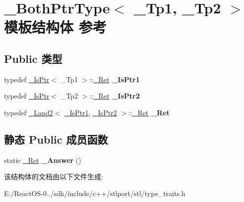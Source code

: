 \hypertarget{struct___both_ptr_type}{}\section{\+\_\+\+Both\+Ptr\+Type$<$ \+\_\+\+Tp1, \+\_\+\+Tp2 $>$ 模板结构体 参考}
\label{struct___both_ptr_type}
\subsection*{Public 类型}
\begin{DoxyCompactItemize}
\item 
\mbox{\label{struct___both_ptr_type_a25b3a6aef390c11484372e0f6ec66699}} 
typedef \hyperlink{struct___is_ptr}{\+\_\+\+Is\+Ptr}$<$ \+\_\+\+Tp1 $>$\+::\hyperlink{struct____false__type}{\+\_\+\+Ret} {\bfseries \+\_\+\+Is\+Ptr1}
\item 
\mbox{\label{struct___both_ptr_type_a33af175b556a1c0d711ba8f55c0f0ba8}} 
typedef \hyperlink{struct___is_ptr}{\+\_\+\+Is\+Ptr}$<$ \+\_\+\+Tp2 $>$\+::\hyperlink{struct____false__type}{\+\_\+\+Ret} {\bfseries \+\_\+\+Is\+Ptr2}
\item 
\mbox{\label{struct___both_ptr_type_a6c8796c4ce6a9fb7cfaae6b50b489fa7}} 
typedef \hyperlink{struct___land2}{\+\_\+\+Land2}$<$ \hyperlink{struct____true__type}{\+\_\+\+Is\+Ptr1}, \hyperlink{struct____true__type}{\+\_\+\+Is\+Ptr2} $>$\+::\hyperlink{struct____false__type}{\+\_\+\+Ret} {\bfseries \+\_\+\+Ret}
\end{DoxyCompactItemize}
\subsection*{静态 Public 成员函数}
\begin{DoxyCompactItemize}
\item 
\mbox{\label{struct___both_ptr_type_ade37db2c359ba122716d6ea6ed5b59fd}} 
static \hyperlink{struct____false__type}{\+\_\+\+Ret} {\bfseries \+\_\+\+Answer} ()
\end{DoxyCompactItemize}


该结构体的文档由以下文件生成\+:\begin{DoxyCompactItemize}
\item 
E\+:/\+React\+O\+S-\/0../sdk/include/c++/stlport/stl/type\+\_\+traits.\+h\end{DoxyCompactItemize}
